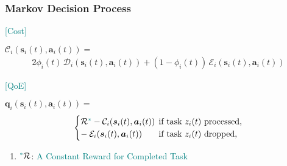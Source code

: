 \begin{frame}
	\frametitle{Markov Decision Process}
	

		\textcolor{teal}{[Cost]} 	\vspace{3mm}
		
		$\mathcal{C}_i(\boldsymbol{s}_i(t),\boldsymbol{a}_i(t)) = $
	\begin{alignat}{2}
		\phi_i(t) \, \mathcal{D}_i(\boldsymbol{s}_i(t),\boldsymbol{a}_i(t)) +(1-\phi_i(t)) \, \mathcal{E}_i(\boldsymbol{s}_i(t),\boldsymbol{a}_i(t))
		\label{23}  
	\end{alignat}

		\vfill

		\textcolor{teal}{[QoE]}   \vspace{3mm}
	

	$	\boldsymbol{q}_i(\boldsymbol{s}_i(t),\boldsymbol{a}_i(t)) =$
\begin{alignat}{2}
	\begin{cases} 
		\mathcal{R}\textcolor{teal}{^*} - \mathcal{C}_i(\boldsymbol{s}_i(t),\boldsymbol{a}_i(t)) & \hspace*{-2mm} \text{if task $z_i(t)$ processed,} \\
		- \hspace*{0.8mm} \mathcal{E}_i(\boldsymbol{s}_i(t),\boldsymbol{a}_i(t)) &	\hspace*{-2mm} \text{if task $z_i(t)$ dropped,}
	\end{cases}
	\label{26}  
\end{alignat}



\begin{enumerate}[]
	
	\item  \hspace{0mm}  $\textcolor{teal}{^*}\mathcal{R}$: \textcolor{teal}{A Constant Reward for Completed Task}
	
	
\end{enumerate}

\end{frame}


